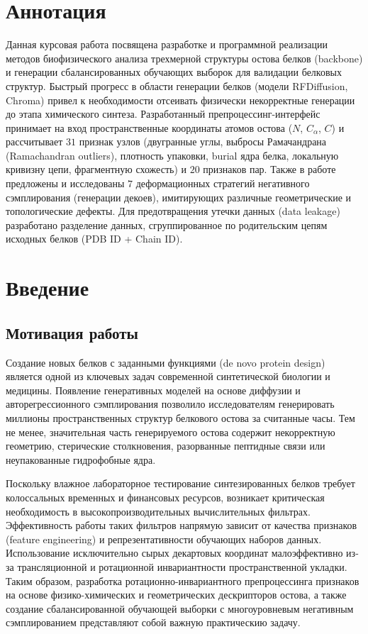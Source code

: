 \documentclass[12pt, a4paper]{article}
\begin{document}
\newpage
\hypersetup{pageanchor=true}

\section*{Аннотация}
Данная курсовая работа посвящена разработке и программной реализации методов биофизического анализа трехмерной структуры остова белков (backbone) и генерации сбалансированных обучающих выборок для валидации белковых структур. Быстрый прогресс в области генерации белков (модели RFDiffusion, Chroma) привел к необходимости отсеивать физически некорректные генерации до этапа химического синтеза. Разработанный пре\-процес\-синг-ин\-тер\-фейс принимает на вход пространственные координаты атомов остова ($N$, $C_\alpha$, $C$) и рассчитывает $31$ признак узлов (двугранные углы, выбросы Рама\-чанд\-рана (Ramachandran outliers), плотность упаковки, burial ядра белка, локальную кривизну цепи, фрагментную схожесть) и $20$ признаков пар. Также в работе предложены и исследованы $7$ деформационных стратегий негативного сэмплирования (генерации декоев), имитирующих различные геометрические и топологические дефекты. Для предотвращения утечки данных (data leakage) разработано разделение данных, сгруппированное по родительским цепям исходных белков (PDB ID + Chain ID).

\newpage

\tableofcontents
\newpage

\section{Введение}

\subsection{Мотивация работы}
Создание новых белков с заданными функциями (de novo protein design) является одной из ключевых задач современной синтетической биологии и медицины. Появление генеративных моделей на основе диффузии и авторегрессионного сэмплирования позволило исследователям генерировать миллионы пространственных структур белкового остова за считанные часы. Тем не менее, значительная часть генерируемого остова содержит некорректную геометрию, стерические столкновения, разорванные пептидные связи или неупакованные гидрофобные ядра.

Поскольку влажное лабораторное тестирование синтезированных белков требует колоссальных временных и финансовых ресурсов, возникает критическая необходимость в высокопроизводительных вычислительных фильтрах. Эффективность работы таких фильтров напрямую зависит от качества признаков (feature engineering) и репрезентативности обучающих наборов данных. Использование исключительно сырых декартовых координат малоэффективно из-за трансляционной и ротационной инвариантности пространственной укладки. Таким образом, разработка ротационно-инвариантного препроцессинга признаков на основе физико-химических и геометрических дескрипторов остова, а также создание сбалансированной обучающей выборки с многоуровневым негативным сэмплированием представляют собой важную практическию задачу.
\end{document}
